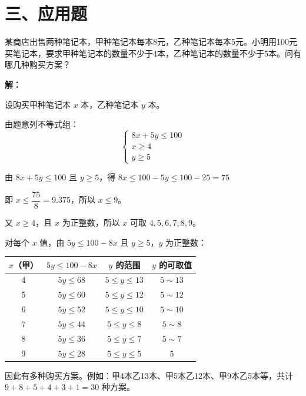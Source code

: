 \documentclass[12pt, a4paper]{ctexart}
\begin{document}
\section*{\textcolor{apppurple}{三、应用题}}

\begin{appbox}[【应用1】购物方案问题]
某商店出售两种笔记本，甲种笔记本每本8元，乙种笔记本每本5元。小明用100元买笔记本，要求甲种笔记本的数量不少于4本，乙种笔记本的数量不少于5本。问有哪几种购买方案？

\textbf{解：}

设购买甲种笔记本 $x$ 本，乙种笔记本 $y$ 本。

由题意列不等式组：
$$\begin{cases} 8x + 5y \leqslant 100 \\ x \geqslant 4 \\ y \geqslant 5 \end{cases}$$

由 $8x + 5y \leqslant 100$ 且 $y \geqslant 5$，得 $8x \leqslant 100 - 5y \leqslant 100 - 25 = 75$

即 $x \leqslant \dfrac{75}{8} = 9.375$，所以 $x \leqslant 9$。

又 $x \geqslant 4$，且 $x$ 为正整数，所以 $x$ 可取 $4, 5, 6, 7, 8, 9$。

对每个 $x$ 值，由 $5y \leqslant 100 - 8x$ 且 $y \geqslant 5$，$y$ 为正整数：

\renewcommand{\arraystretch}{1.2}
\begin{center}
\begin{tabular}{|c|c|c|c|}
\hline
$x$（甲） & $5y \leqslant 100-8x$ & $y$ 的范围 & $y$ 的可取值 \\
\hline
4 & $5y \leqslant 68$ & $5 \leqslant y \leqslant 13$ & $5 \sim 13$ \\
\hline
5 & $5y \leqslant 60$ & $5 \leqslant y \leqslant 12$ & $5 \sim 12$ \\
\hline
6 & $5y \leqslant 52$ & $5 \leqslant y \leqslant 10$ & $5 \sim 10$ \\
\hline
7 & $5y \leqslant 44$ & $5 \leqslant y \leqslant 8$ & $5 \sim 8$ \\
\hline
8 & $5y \leqslant 36$ & $5 \leqslant y \leqslant 7$ & $5 \sim 7$ \\
\hline
9 & $5y \leqslant 28$ & $5 \leqslant y \leqslant 5$ & $5$ \\
\hline
\end{tabular}
\end{center}

因此有多种购买方案。例如：甲4本乙13本、甲5本乙12本、甲9本乙5本等，共计 $9+8+5+4+3+1 = 30$ 种方案。
\end{appbox}
\end{document}
